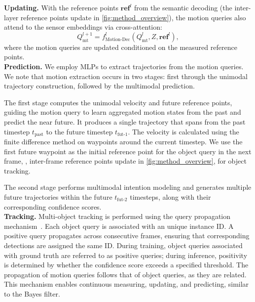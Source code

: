 \textbf{Updating.} With the reference points $\mathbf{ref}^{l}$ from the semantic decoding (the inter-layer reference points update in \cref{fig:method_overview}), the motion queries also attend to the sensor embeddings via cross-attention:
\begin{equation}
  Q_{\text{mt}}^{l+1} = f_{\text{Motion-Dec}}^l (Q_{\text{mt}}^l, Z, \mathbf{ref}^{l}),
\end{equation}
where the motion queries are updated conditioned on the measured reference points. \\

\textbf{Prediction.} We employ MLPs to extract trajectories from the motion queries. We note that motion extraction occurs in two stages: first through the unimodal trajectory construction, followed by the multimodal prediction. 

The first stage computes the unimodal velocity and future reference points, guiding the motion query to learn aggregated motion states from the past and predict the near future. It produces a single trajectory that spans from the past timestep $ t_{\text{past}} $ to the future timestep $ t_{\text{fut-1}} $. The velocity is calculated using the finite difference method on waypoints around the current timestep. We use the first future waypoint as the initial reference point for the object query in the next frame, \ie, inter-frame reference points update in \cref{fig:method_overview}, for object tracking. 

The second stage performs multimodal intention modeling and generates multiple future trajectories within the future $ t_{\text{fut-2}} $ timesteps, along with their corresponding confidence scores. 
\\

\textbf{Tracking.} Multi-object tracking is performed using the query propagation mechanism~\cite{zeng2022motr, lin2023sparse4d}. Each object query is associated with an unique instance ID. A positive query propagates across consecutive frames, ensuring that corresponding detections are assigned the same ID. During training, object queries associated with ground truth are referred to as positive queries; during inference, positivity is determined by whether the confidence score exceeds a specified threshold. The propagation of motion queries follows that of object queries, as they are related. This mechanism enables continuous measuring, updating, and predicting, similar to the Bayes filter. 

